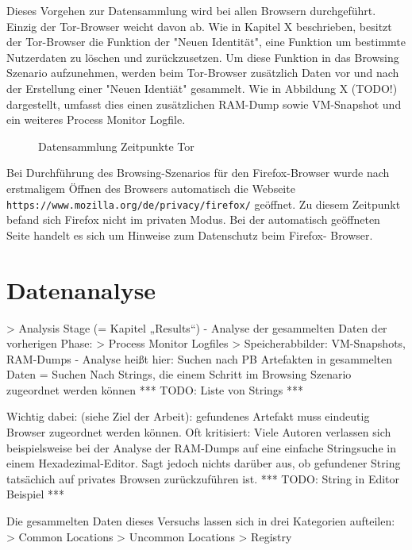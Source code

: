 Dieses Vorgehen zur Datensammlung wird bei allen Browsern durchgeführt. Einzig der Tor-Browser weicht davon ab. Wie in Kapitel X beschrieben, besitzt der Tor-Browser die Funktion der "Neuen Identität", eine Funktion um bestimmte Nutzerdaten zu löschen und zurückzusetzen.
Um diese Funktion in das Browsing Szenario aufzunehmen, werden beim Tor-Browser zusätzlich Daten vor und nach der Erstellung einer "Neuen Identiät" gesammelt. Wie in Abbildung X (TODO!) dargestellt, umfasst dies einen zusätzlichen RAM-Dump sowie VM-Snapshot und ein weiteres Process Monitor Logfile.
\begin{figure}[h!]
	\centering
	\small
	\centerline{\resizebox{\linewidth}{!}{}}
	\caption{Datensammlung Zeitpunkte Tor}
	\label{fig:jes}
\end{figure}
	
Bei Durchführung des Browsing-Szenarios für den Firefox-Browser wurde nach erstmaligem Öffnen des Browsers automatisch die Webseite \texttt{https://www.mozilla.org/de/privacy/firefox/} geöffnet. Zu diesem Zeitpunkt befand sich Firefox nicht im privaten Modus. Bei der automatisch geöffneten Seite handelt es sich um Hinweise zum Datenschutz beim Firefox- Browser.

\section{Datenanalyse}

> Analysis Stage (= Kapitel „Results“)
- Analyse der gesammelten Daten der vorherigen Phase: 
	> Process Monitor Logfiles	
	> Speicherabbilder: VM-Snapshots, RAM-Dumps
- Analyse heißt hier: Suchen nach PB Artefakten in gesammelten Daten
= Suchen Nach Strings, die einem Schritt im Browsing Szenario zugeordnet werden können
*** TODO: Liste von Strings ***

Wichtig dabei: (siehe Ziel der Arbeit): gefundenes Artefakt muss eindeutig Browser zugeordnet werden können.
Oft kritisiert: Viele Autoren verlassen sich beispielsweise bei der Analyse der RAM-Dumps auf eine einfache Stringsuche in einem Hexadezimal-Editor.
Sagt jedoch nichts darüber aus, ob gefundener String tatsächich auf privates Browsen zurückzuführen ist.
*** TODO: String in Editor Beispiel ***

Die gesammelten Daten dieses Versuchs lassen sich in drei Kategorien aufteilen:
> Common Locations
> Uncommon Locations	
> Registry

